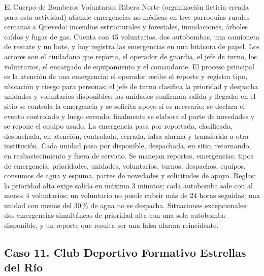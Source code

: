 \documentclass[11pt]{article}
\newcommand{\subseccion}[1]{\subsection{\textcolor{midblue}{#1}}}
\begin{document}
El Cuerpo de Bomberos Voluntarios Ribera Norte (organización ficticia creada para esta actividad) atiende emergencias no médicas en tres parroquias rurales cercanas a Quevedo: incendios estructurales y forestales, inundaciones, árboles caídos y fugas de gas. Cuenta con 45 voluntarios, dos autobombas, una camioneta de rescate y un bote, y hoy registra las emergencias en una bitácora de papel. Los actores son el ciudadano que reporta, el operador de guardia, el jefe de turno, los voluntarios, el encargado de equipamiento y el comandante. El proceso principal es la atención de una emergencia: el operador recibe el reporte y registra tipo, ubicación y riesgo para personas; el jefe de turno clasifica la prioridad y despacha unidades y voluntarios disponibles; las unidades confirman salida y llegada; en el sitio se controla la emergencia y se solicita apoyo si es necesario; se declara el evento controlado y luego cerrado; finalmente se elabora el parte de novedades y se repone el equipo usado. La emergencia pasa por reportada, clasificada, despachada, en atención, controlada, cerrada, falsa alarma y transferida a otra institución. Cada unidad pasa por disponible, despachada, en sitio, retornando, en reabastecimiento y fuera de servicio. Se manejan reportes, emergencias, tipos de emergencia, prioridades, unidades, voluntarios, turnos, despachos, equipos, consumos de agua y espuma, partes de novedades y solicitudes de apoyo. Reglas: la prioridad alta exige salida en máximo 3 minutos; cada autobomba sale con al menos 4 voluntarios; un voluntario no puede cubrir más de 24 horas seguidas; una unidad con menos del 30\,\% de agua no se despacha. Situaciones excepcionales: dos emergencias simultáneas de prioridad alta con una sola autobomba disponible, y un reporte que resulta ser una falsa alarma reincidente.

\subseccion{Caso 11. Club Deportivo Formativo Estrellas del Río}
\end{document}
